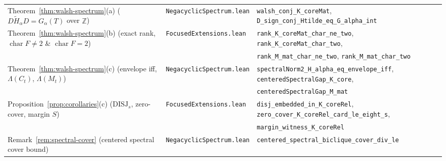 \documentclass[11pt,reqno]{amsart}
\theoremstyle{definition}
\theoremstyle{remark}
\newcommand{\ZZ}{\mathbb{Z}}
\newcommand{\DISJ}{\mathrm{DISJ}}
\numberwithin{equation}{section}
\begin{document}
\begin{table}[htbp]
{\begin{tabular}{@{}lll@{}}
    Theorem~\ref{thm:walsh-spectrum}(a) ($D\widetilde{H}_\alpha D = G_\alpha(T)$ over $\ZZ$) & \texttt{NegacyclicSpectrum.lean} & \texttt{walsh\_conj\_K\_coreMat}, \texttt{D\_sign\_conj\_Htilde\_eq\_G\_alpha\_int} \\
    Theorem~\ref{thm:walsh-spectrum}(b) (exact rank, $\operatorname{char} F \neq 2$ \& $\operatorname{char} F = 2$) & \texttt{FocusedExtensions.lean} & \texttt{rank\_K\_coreMat\_char\_ne\_two}, \texttt{rank\_K\_coreMat\_char\_two}, \\
     & & \texttt{rank\_M\_mat\_char\_ne\_two}, \texttt{rank\_M\_mat\_char\_two} \\
    Theorem~\ref{thm:walsh-spectrum}(c) (envelope iff, $\Lambda(C_t)$, $\Lambda(M_t)$) & \texttt{NegacyclicSpectrum.lean} & \texttt{spectralNorm2\_H\_alpha\_eq\_envelope\_iff}, \texttt{centeredSpectralGap\_K\_core}, \\
     & & \texttt{centeredSpectralGap\_M\_mat} \\
    Proposition~\ref{prop:corollaries}(c) ($\DISJ_s$, zero-cover, margin $S$) & \texttt{FocusedExtensions.lean} & \texttt{disj\_embedded\_in\_K\_coreRel}, \texttt{zero\_cover\_K\_coreRel\_card\_le\_eight\_s}, \\
     & & \texttt{margin\_witness\_K\_coreRel} \\
    Remark~\ref{rem:spectral-cover} (centered spectral cover bound) & \texttt{NegacyclicSpectrum.lean} & \texttt{centered\_spectral\_biclique\_cover\_div\_le} \\
    \bottomrule
  \end{tabular}%
  }
\end{table}
\end{document}
